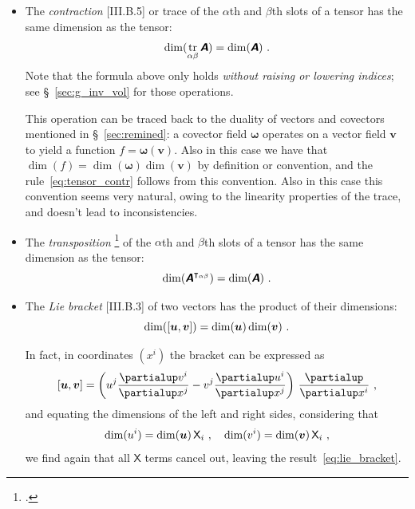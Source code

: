 \documentclass[\ifafour a4paper,12pt,\else a5paper,10pt,\fi%
onecolumn,oneside,article,%
british%
]{memoir}
\theoremstyle{remark}
\theoremstyle{innote}
\newcommand*{\mathte}[1]{\textbf{\textit{\textsf{#1}}}}
\newcommand*{\citep}{\footcites}
\newcommand*{\de}{\partialup}%
\DeclareMathOperator{\tr}{tr}%
\DeclarePairedDelimiter\clcl{[}{]}
\renewcommand*{\|}[1][]{\nonscript\,#1\vert\nonscript\;\mathopen{}}
\newcommand*{\sect}{\S}%
\newcommand*{\Xx}{\textsf{X}}
\newcommand*{\yA}{\mathte{A}}
\newcommand*{\yom}{\bm{\omega}}
\newcommand*{\yv}{\bm{v}}
\newcommand*{\yu}{\bm{u}}
\renewcommand*{\i}{\indices}
\newcommand*{\dex}[1][i]{\frac{\de}{\de x^{#1}}}
\begin{document}
\begin{itemize}[wide=0pt]
\item The \emph{contraction} [III.B.5] or trace of the $\alpha$th and $\beta$th
  slots of a tensor has the same dimension as the tensor:
  \begin{equation}
    \dim(\tr_{\alpha\beta}\yA) = \dim(\yA)\ .
    \label{eq:tensor_contr}
  \end{equation}
  Note that the formula above only holds \emph{without raising or lowering
    indices}; see \sect~\ref{sec:g_inv_vol} for those operations.

  This operation can be traced back to the duality of vectors and covectors
  mentioned in \sect~\ref{sec:remined}: a covector field $\yom$ operates on
  a vector field $\yv$ to yield a function $f=\yom(\yv)$. Also in this case
  we have that $\dim(f)=\dim(\yom)\dim(\yv)$ by definition or convention,
  and the rule~\eqref{eq:tensor_contr} follows from this convention. Also
  in this case this convention seems very natural, owing to the linearity
  properties of the trace, and doesn't lead to inconsistencies.

  

\item The \emph{transposition} \citep[called \enquote{building an isomer}
  by][\sect~I.3 p.~13]{schouten1924_r1954}[\sect~II.4
  p.~20]{schouten1951_r1989} of the $\alpha$th and $\beta$th slots of a
  tensor has the same dimension as the tensor:
  \begin{equation}
    \dim(\yA^{\intercal_{\alpha\beta}}) = \dim(\yA)\ .
    \label{eq:tensor_transp}
  \end{equation}


\item The \emph{Lie bracket} [III.B.3] of two vectors has the product of their dimensions:
  \begin{equation}
    \dim(\clcl{\yu,\yv}) =\dim(\yu)\dim(\yv)\ .
    \label{eq:lie_bracket}
\end{equation}

In fact, in coordinates $(x^{i})$ the bracket can be expressed as
\begin{equation}
  \label{eq:bracket_coords}
  \clcl{\yu,\yv} =
  \biggl( u\i{^{j}}\frac{\de v\i{^{i}}}{\de x\i{^{j}}}
  - v\i{^{j}}\frac{\de u\i{^{i}}}{\de x\i{^{j}}} \biggr)\ \dex\ ,
\end{equation}
and equating the dimensions of the left and right sides, considering that
\begin{equation}
  \label{eq:dim_u_and_v}
  \dim(u\i{^{i}}) = \dim(\yu)\,\Xx_{i}\ ,\quad
  \dim(v\i{^{i}}) = \dim(\yv)\,\Xx_{i}\ ,
\end{equation}
we find again that all $\Xx$ terms cancel out, leaving the
result~\eqref{eq:lie_bracket}.


\end{itemize}
\end{document}
